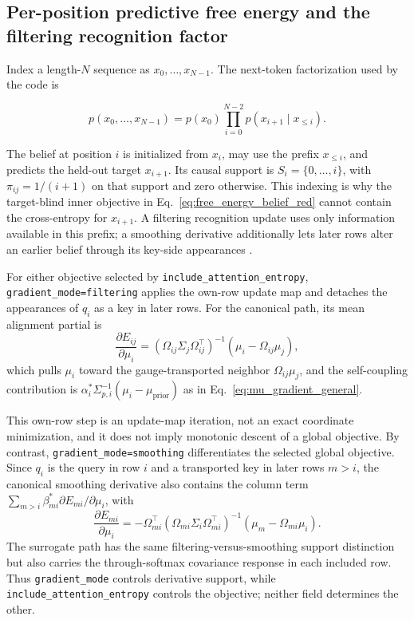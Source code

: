\documentclass[twoside,11pt]{article}
\begin{document}
\subsection{Per-position predictive free energy and the filtering recognition factor}
\label{sec:filtering_free_energy}

Index a length-$N$ sequence as $x_0,\ldots,x_{N-1}$. The next-token factorization used by the code is

\begin{equation}
p(x_0,\ldots,x_{N-1})
=p(x_0)\prod_{i=0}^{N-2}p(x_{i+1}\mid x_{\leq i}).
\label{eq:next_token_indexing}
\end{equation}

The belief at position $i$ is initialized from $x_i$, may use the prefix $x_{\leq i}$, and predicts the held-out target $x_{i+1}$. Its causal support is $S_i=\{0,\ldots,i\}$, with $\pi_{ij}=1/(i+1)$ on that support and zero otherwise. This indexing is why the target-blind inner objective in Eq.~\eqref{eq:free_energy_belief_red} cannot contain the cross-entropy for $x_{i+1}$. A filtering recognition update uses only information available in this prefix; a smoothing derivative additionally lets later rows alter an earlier belief through its key-side appearances \citep{chung2015recurrent,fraccaro2016sequential,krishnan2017structured}.

For either objective selected by \texttt{include\_attention\_entropy}, \texttt{gradient\_mode=filtering} applies the own-row update map and detaches the appearances of $q_i$ as a key in later rows. For the canonical path, its mean alignment partial is
\begin{equation}
\frac{\partial E_{ij}}{\partial \mu_i} = \left(\Omega_{ij}\Sigma_j\Omega_{ij}^\top\right)^{-1}\left(\mu_i - \Omega_{ij}\mu_j\right),
\label{eq:queryside_partial}
\end{equation}
which pulls $\mu_i$ toward the gauge-transported neighbor $\Omega_{ij}\mu_j$, and the self-coupling contribution is $\alpha_i^*\Sigma_{p,i}^{-1}(\mu_i-\mu_{\text{prior}})$ as in Eq.~\eqref{eq:mu_gradient_general}.

This own-row step is an update-map iteration, not an exact coordinate minimization, and it does not imply monotonic descent of a global objective. By contrast, \texttt{gradient\_mode=smoothing} differentiates the selected global objective. Since $q_i$ is the query in row $i$ and a transported key in later rows $m>i$, the canonical smoothing derivative also contains the column term $\sum_{m>i}\beta_{mi}^*\partial E_{mi}/\partial\mu_i$, with
\begin{equation}
\frac{\partial E_{mi}}{\partial \mu_i} = -\Omega_{mi}^\top \left(\Omega_{mi}\Sigma_i\Omega_{mi}^\top\right)^{-1}\left(\mu_m - \Omega_{mi}\mu_i\right).
\label{eq:keyside_partial}
\end{equation}
The surrogate path has the same filtering-versus-smoothing support distinction but also carries the through-softmax covariance response in each included row. Thus \texttt{gradient\_mode} controls derivative support, while \texttt{include\_attention\_entropy} controls the objective; neither field determines the other.
\end{document}
